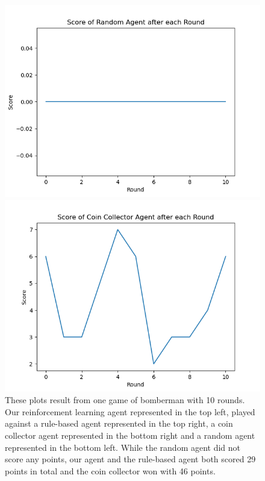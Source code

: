 \begin{figure}[H]
\begin{minipage}{0.49\textwidth}
	\end{minipage}
	\begin{minipage}{0.49\textwidth}
		\centering
		\includegraphics[scale=0.52]{images/random_scores11_1.png}
	\end{minipage}
	\begin{minipage}{0.49\textwidth}
		\centering
		\includegraphics[scale=0.52]{images/coin_scores11_1.png}
	\end{minipage}
	\caption{These plots result from one game of bomberman with 10 rounds. Our reinforcement learning agent represented in the top left, played against a rule-based agent represented in the top right, a coin collector agent represented in the bottom right and a random agent represented in the bottom left. While the random agent did not score any points, our agent and the rule-based agent both scored 29 points in total and the coin collector won with 46 points.}
	\label{fig:game1}
\end{figure}

